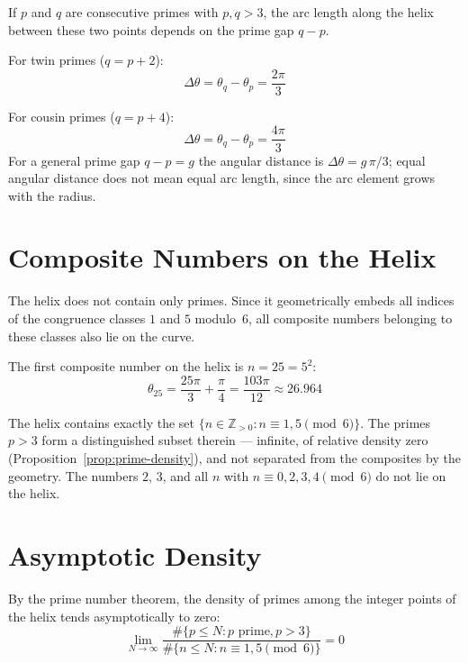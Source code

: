 \begin{remark}\label{rem:prime-gaps}
If $p$ and $q$ are consecutive primes with $p, q > 3$, the arc length
along the helix between these two points depends on the prime gap $q - p$.

For twin primes ($q = p + 2$):
\[
\Delta\theta = \theta_q - \theta_p = \frac{2\pi}{3}
\]

For cousin primes ($q = p + 4$):
\[
\Delta\theta = \theta_q - \theta_p = \frac{4\pi}{3}
\]
For a general prime gap $q - p = g$ the angular distance is
$\Delta\theta = g\,\pi/3$; equal angular distance does not mean equal
arc length, since the arc element grows with the radius.
\end{remark}

\section{Composite Numbers on the Helix}\label{sec:composites}

The helix does not contain only primes. Since it geometrically embeds all
indices of the congruence classes $1$ and $5$ modulo~$6$, all composite
numbers belonging to these classes also lie on the curve.

\begin{example}\label{ex:first-composite}
The first composite number on the helix is $n = 25 = 5^2$:
\[
\theta_{25} = \frac{25\pi}{3} + \frac{\pi}{4} = \frac{103\pi}{12} \approx 26.964
\]
\end{example}

\begin{remark}\label{rem:complete-characterisation}
The helix contains exactly the set
$\{n \in \mathbb{Z}_{>0} : n \equiv 1, 5 \pmod{6}\}$. The primes $p > 3$
form a distinguished subset therein --- infinite, of relative density
zero (Proposition~\ref{prop:prime-density}), and not separated from the
composites by the geometry. The numbers $2$, $3$,
and all $n$ with $n \equiv 0, 2, 3, 4 \pmod{6}$ do not lie on the helix.
\end{remark}

\section{Asymptotic Density}

\begin{proposition}\label{prop:prime-density}
By the prime number theorem, the density of primes among the integer
points of the helix tends asymptotically to zero:
\[
\lim_{N \to \infty} \frac{\#\{p \leq N : p \text{ prime}, p > 3\}}{\#\{n \leq N : n \equiv 1, 5 \pmod{6}\}} = 0
\]
\end{proposition}


